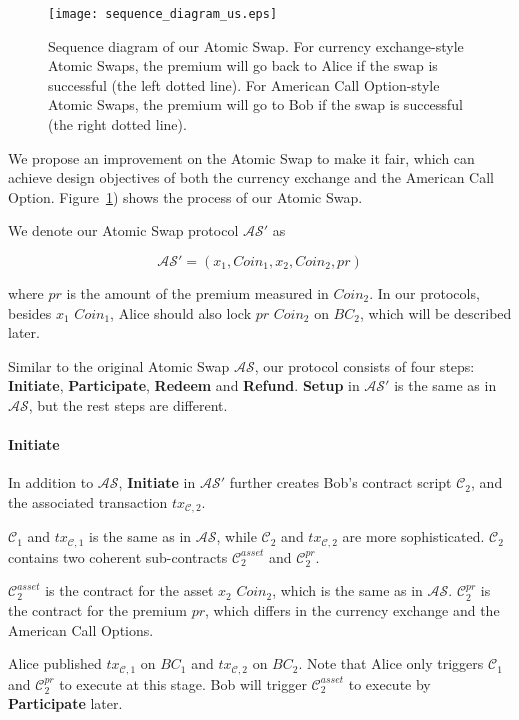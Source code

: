 \begin{figure}[htp]
    \texttt{[image: sequence\_diagram\_us.eps]}
    \caption{Sequence diagram of our Atomic Swap.
    For currency exchange-style Atomic Swaps, the premium will go back to Alice if the swap is successful (the left dotted line).
    For American Call Option-style Atomic Swaps, the premium will go to Bob if the swap is successful (the right dotted line).}
    \label{fig:sequence_diagram_us}
\end{figure}

We propose an improvement on the Atomic Swap to make it fair, which can achieve design objectives of both the currency exchange and the American Call Option.
Figure~\ref{fig:sequence_diagram_us}) shows the process of our Atomic Swap.

We denote our Atomic Swap protocol $\mathcal{AS}'$ as

$$\mathcal{AS}' = (x_1, Coin_1, x_2, Coin_2, pr)$$

where $pr$ is the amount of the premium measured in $Coin_2$.
In our protocols, besides $x_1$ $Coin_1$, Alice should also lock $pr$ $Coin_2$ on $BC_2$, which will be described later.

Similar to the original Atomic Swap $\mathcal{AS}$, our protocol consists of four steps:
\textbf{Initiate}, \textbf{Participate}, \textbf{Redeem} and \textbf{Refund}.
\textbf{Setup} in $\mathcal{AS}'$ is the same as in $\mathcal{AS}$, but the rest steps are different. 

\paragraph{\textbf{Initiate}}
In addition to $\mathcal{AS}$, \textbf{Initiate} in $\mathcal{AS}'$ further creates Bob's contract script $\mathcal{C}_2$, and
the associated transaction $tx_{\mathcal{C}, 2}$.

$\mathcal{C}_1$ and $tx_{\mathcal{C}, 1}$ is the same as in $\mathcal{AS}$,
while $\mathcal{C}_2$ and $tx_{\mathcal{C}, 2}$ are more sophisticated.
$\mathcal{C}_2$ contains two coherent sub-contracts $\mathcal{C}^{asset}_2$ and $\mathcal{C}^{pr}_2$.

$\mathcal{C}^{asset}_2$ is the contract for the asset $x_2$ $Coin_2$, which is the same as in $\mathcal{AS}$.
$\mathcal{C}^{pr}_2$ is the contract for the premium $pr$, which differs in the currency exchange and the American Call Options.

Alice published $tx_{\mathcal{C}, 1}$ on $BC_1$ and $tx_{\mathcal{C}, 2}$ on $BC_2$.
Note that Alice only triggers $\mathcal{C}_1$ and $\mathcal{C}^{pr}_2$ to execute at this stage.
Bob will trigger $\mathcal{C}^{asset}_2$ to execute by \textbf{Participate} later.

